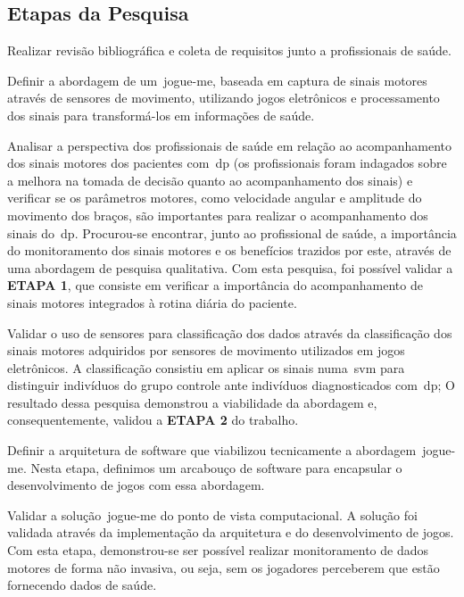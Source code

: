 \subsection{Etapas da Pesquisa}
\begin{enumerate}

\item{Realizar revisão bibliográfica e coleta de requisitos junto a profissionais de saúde.}

\item{Definir a abordagem de um~\ac{jogue-me}, baseada em captura de sinais motores através de sensores de movimento, utilizando jogos eletrônicos e processamento dos sinais para transformá-los em informações de saúde.}

\item{Analisar a perspectiva dos profissionais de saúde em relação ao acompanhamento dos sinais motores dos pacientes com~\ac{dp} (os profissionais foram indagados sobre a melhora na tomada de decisão quanto ao acompanhamento dos sinais) e verificar se os parâmetros motores, como velocidade angular e amplitude do movimento dos braços, são importantes para realizar o acompanhamento dos sinais do~\ac{dp}. Procurou-se encontrar, junto ao profissional de saúde, a importância do monitoramento dos sinais motores e os benefícios trazidos por este, através de uma abordagem de pesquisa qualitativa. Com esta pesquisa, foi possível validar a \textbf{ETAPA 1}, que consiste em verificar a importância do acompanhamento de sinais motores integrados à rotina diária do paciente.}

\item{Validar o uso de sensores para classificação dos dados através da classificação dos sinais motores adquiridos por sensores de movimento utilizados em jogos eletrônicos. A classificação consistiu em aplicar os sinais numa~\ac{svm} para distinguir indivíduos do grupo controle ante indivíduos diagnosticados com~\ac{dp};
O resultado dessa pesquisa demonstrou a viabilidade da abordagem e, consequentemente, validou a \textbf{ETAPA 2} do trabalho.

\item{Definir a arquitetura de software que viabilizou tecnicamente a abordagem~\ac{jogue-me}. Nesta etapa, definimos um arcabouço de software para encapsular o desenvolvimento de jogos com essa abordagem.}

\item{Validar a solução~\ac{jogue-me} do ponto de vista computacional. A solução foi validada através da implementação da arquitetura e do desenvolvimento de jogos. Com esta etapa, demonstrou-se ser possível realizar monitoramento de dados motores de forma não invasiva, ou seja, sem os jogadores perceberem que estão fornecendo dados de saúde.}

}
\end{enumerate}
